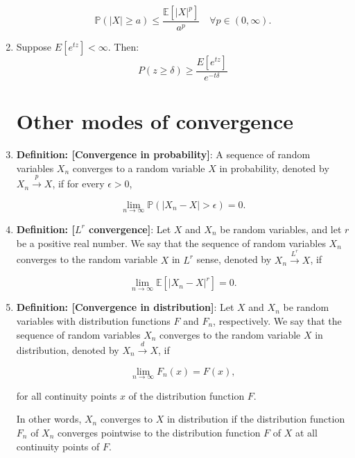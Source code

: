 \documentclass[12pt,oneside]{book}
\begin{document}
\begin{enumerate}
\begin{equation*}
\mathbb{P}(|X| \geq a) \leq \frac{\mathbb{E}\left[|X|^p\right]}{a^p}\quad\forall p\in(0,\infty).
\end{equation*}
\item Suppose $E[e^{tz}]<\infty$. Then:
    $$P(z\geq \delta)\geq \frac{E[e^{tz}]}{e^{-t\delta}}$$

\section{Other modes of convergence}
\item \textbf{Definition: [Convergence in probability]}: A sequence of random variables ${X_n}$ converges to a random variable $X$ in probability, denoted by $X_n \xrightarrow{p} X$, if for every $\epsilon > 0$,

\begin{equation*}
\lim_{n\to\infty} \mathbb{P} \left( |X_n - X| > \epsilon \right) = 0.
\end{equation*}

\item \textbf{Definition: [$L^r$ convergence]}: Let $X$ and $X_n$ be random variables, and let $r$ be a positive real number. We say that the sequence of random variables ${X_n}$ converges to the random variable $X$ in $L^r$ sense, denoted by $X_n \xrightarrow{L^r} X$, if

\begin{equation*}
\lim_{n\to\infty} \mathbb{E} \left[ |X_n - X|^r \right] = 0.
\end{equation*}

\item \textbf{Definition: [Convergence in distribution]}: Let $X$ and $X_n$ be random variables with distribution functions $F$ and $F_n$, respectively. We say that the sequence of random variables ${X_n}$ converges to the random variable $X$ in distribution, denoted by $X_n \xrightarrow{d} X$, if

\begin{equation*}
\lim_{n\to\infty} F_n(x) = F(x),
\end{equation*}

for all continuity points $x$ of the distribution function $F$.

In other words, $X_n$ converges to $X$ in distribution if the distribution function $F_n$ of $X_n$ converges pointwise to the distribution function $F$ of $X$ at all continuity points of $F$.


\end{enumerate}
\end{document}
